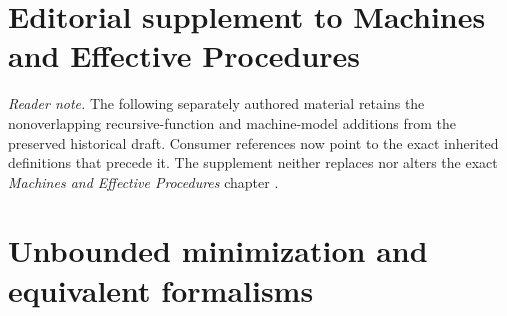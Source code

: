 \section*{Editorial supplement to Machines and Effective Procedures}

\noindent\textit{Reader note.} The following separately authored material
retains the nonoverlapping recursive-function and machine-model additions from
the preserved historical draft.  Consumer references now point to the exact
inherited definitions that precede it.  The supplement neither replaces nor
alters the exact \emph{Machines and Effective Procedures} chapter
\cite{Kleene1952,ShepherdsonSturgis1963}.

\section[Minimization and Formalisms]{Unbounded minimization and equivalent formalisms}
\label{sec:p04-partial-recursion}

